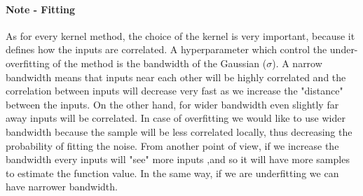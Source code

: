 \documentclass[../main.tex]{subfiles}
\begin{document}
\paragraph{Note - Fitting} As for every kernel method, the choice of the kernel is very important, because it defines how the inputs are correlated. A hyperparameter which control the under-overfitting of the method is the bandwidth of the Gaussian ($\sigma$). A narrow bandwidth means that inputs near each other will be highly correlated and the correlation between inputs will decrease very fast as we increase the "distance" between the inputs. On the other hand, for wider bandwidth even slightly far away inputs will be correlated. In case of overfitting we would like to use wider bandwidth because the sample will be less correlated locally, thus decreasing the probability of fitting the noise. From another point of view, if we increase the bandwidth every inputs will "see" more inputs ,and so it will have more samples to estimate the function value. In the same way, if we are underfitting we can have narrower bandwidth.
\end{document}
